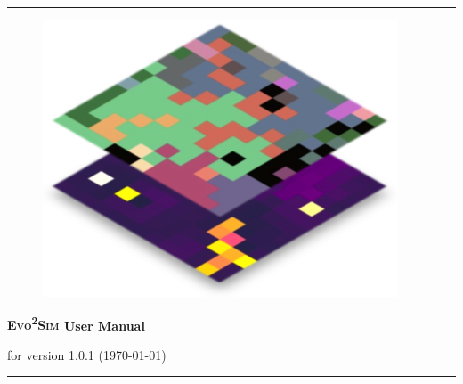 \documentclass[english, a4paper, 12pt]{report}
\newcommand{\packageName}{\textsc{Evo\textsuperscript{2}Sim}}
\newcommand{\packageVersion}{1.0.1}
\begin{document}


\thispagestyle{empty}

\rule{\linewidth}{2pt}
\begin{figure}[!h]
\centering
\includegraphics[width=0.2\linewidth]{./figures/icon.png}
\end{figure}

\begin{center}
{\Huge {\bf {\packageName} User Manual}}

for version {\packageVersion} (\today)
\end{center}
\rule{\linewidth}{2pt}

\newpage

\tableofcontents

\newpage










\appendix




\end{document}
